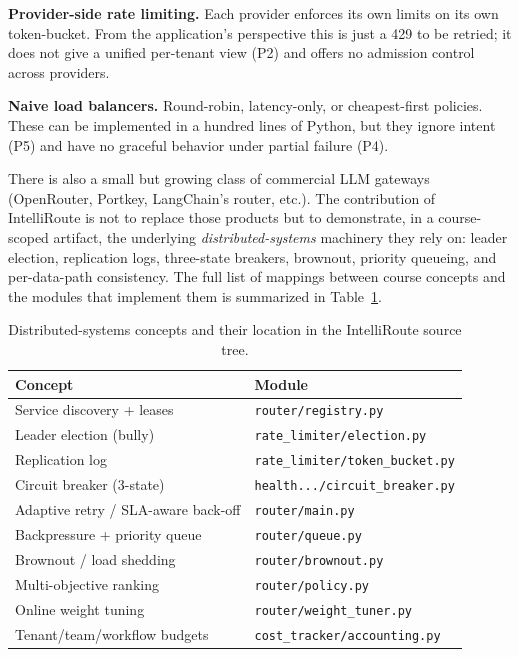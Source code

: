 \documentclass[conference,letterpaper]{IEEEtran}
\begin{document}
\textbf{Provider-side rate limiting.} Each provider enforces its own
limits on its own token-bucket. From the application's perspective
this is just a 429 to be retried; it does not give a unified
per-tenant view (P2) and offers no admission control across
providers.

\textbf{Naive load balancers.} Round-robin, latency-only, or
cheapest-first policies. These can be implemented in a hundred lines
of Python, but they ignore intent (P5) and have no graceful behavior
under partial failure (P4).

There is also a small but growing class of commercial LLM gateways
(OpenRouter, Portkey, LangChain's router, etc.). The contribution of
IntelliRoute is not to replace those products but to demonstrate, in
a course-scoped artifact, the underlying \emph{distributed-systems}
machinery they rely on: leader election, replication logs,
three-state breakers, brownout, priority queueing, and per-data-path
consistency. The full list of mappings between course concepts and
the modules that implement them is summarized in
Table~\ref{tab:concepts}.

\begin{table}[!t]
\caption{Distributed-systems concepts and their location in the
         IntelliRoute source tree.}
\label{tab:concepts}
\centering
\renewcommand{\arraystretch}{1.15}
\setlength{\tabcolsep}{3pt}
\begin{tabularx}{\columnwidth}{@{}lX@{}}
\toprule
Concept & Module \\
\midrule
Service discovery + leases & \texttt{router/registry.py}\\
Leader election (bully)    & \texttt{rate\_limiter/election.py}\\
Replication log            & \texttt{rate\_limiter/token\_bucket.py}\\
Circuit breaker (3-state)  & \texttt{health.../circuit\_breaker.py}\\
Adaptive retry / SLA-aware back-off & \texttt{router/main.py}\\
Backpressure + priority queue & \texttt{router/queue.py}\\
Brownout / load shedding   & \texttt{router/brownout.py}\\
Multi-objective ranking    & \texttt{router/policy.py}\\
Online weight tuning       & \texttt{router/weight\_tuner.py}\\
Tenant/team/workflow budgets & \texttt{cost\_tracker/accounting.py}\\
\bottomrule
\end{tabularx}
\end{table}
\end{document}
